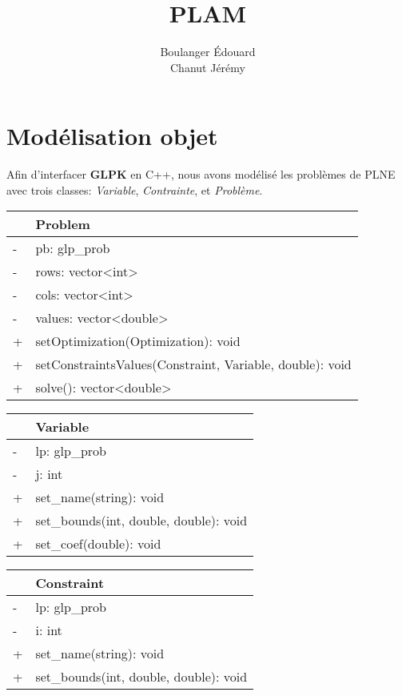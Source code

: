 \documentclass[11pt]{article}
\title{\textbf{PLAM}}
\author{Boulanger \'Edouard\\
		Chanut J\'er\'emy}
\date{}
\begin{document}
\maketitle

\section{Mod\'elisation objet}
Afin d'interfacer \textbf{GLPK} en C++, nous avons mod\'elis\'e les probl\`emes de PLNE avec trois classes: \emph{Variable}, \emph{Contrainte}, et \emph{Probl\`eme}.

\begin{table}[h]
\begin{center}
\begin{tabular}{|ll|}
\hline
 & \textbf{Problem} \\
\hline
- & pb: glp\_prob \\
- & rows: vector<int> \\
- & cols: vector<int> \\
- & values: vector<double> \\
\hline
+ & setOptimization(Optimization): void \\
+ & setConstraintsValues(Constraint, Variable, double): void \\
+ & solve(): vector<double> \\
\hline
\end{tabular}
\end{center}
\end{table}

\begin{table}[h]
\begin{center}
\begin{tabular}{|ll|}
\hline
 & \textbf{Variable} \\
\hline
- & lp: glp\_prob \\
- & j: int \\
\hline
+ & set\_name(string): void \\
+ & set\_bounds(int, double, double): void \\
+ & set\_coef(double): void \\
\hline
\end{tabular}
\end{center}
\end{table}

\begin{table}[h]
\begin{center}
\begin{tabular}{|ll|}
\hline
 & \textbf{Constraint} \\
\hline
- & lp: glp\_prob \\
- & i: int \\
\hline
+ & set\_name(string): void \\
+ & set\_bounds(int, double, double): void \\
\hline
\end{tabular}
\end{center}
\end{table}
\end{document}
